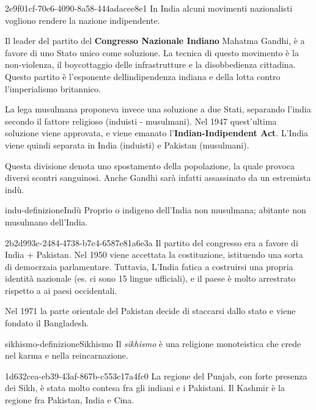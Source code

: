 \documentclass[preview]{standalone}
\begin{document}
\begin{snippet}{2e9f01cf-70e6-4090-8a58-444adacee8e1}
    In India alcuni movimenti nazionalisti vogliono
    rendere la nazione indipendente. 
    
    Il leader del partito del \textbf{Congresso Nazionale Indiano} Mahatma Gandhi,
    è a favore di uno Stato unico come soluzione.
    La tecnica di questo movimento è la non-violenza, il boycottaggio
    delle infrastrutture e la disobbedienza cittadina.
    Questo partito è l'esponente dellindipendenza indiana e della lotta contro l'imperialismo britannico.
    
    La lega musulmana proponeva invece una soluzione a due Stati,
    separando l'india secondo il fattore religioso (induisti - musulmani).
    Nel 1947 quest'ultima soluzione viene approvata, e viene emanato
    l'\textbf{Indian-Indipendent Act}. 
    L'India viene quindi separata in India (induisti) e Pakistan (musulmani).
    
    Questa divisione denota uno spostamento della popolazione,
    la quale provoca diversi scontri sanguinosi.
    Anche Gandhi sarà infatti assassinato da un estremista indù.
\end{snippet}

\begin{snippetdefinition}{indu-definizione}{Indù}
    Proprio o indigeno dell'India non musulmana; abitante non musulmano dell'India.
\end{snippetdefinition}

\begin{snippet}{2b2d993c-2484-4738-b7c4-6587e81a6e3a}
    Il partito del congresso era a favore di India + Pakistan. 
    Nel 1950 viene accettata la costituzione, istituendo una sorta di democrzaia parlamentare.
    Tuttavia, L'India fatica a costruirsi una propria identità nazionale (es. ci sono 15 lingue ufficiali),
    e il paese è molto arrestrato rispetto a ai paesi occidentali.

    Nel 1971 la parte orientale del Pakistan decide di staccarsi dallo stato e viene fondato
    il Bangladesh.
\end{snippet}

\begin{snippetdefinition}{sikhismo-definizione}{Sikhismo}
    Il \textit{sikhismo} è una religione monoteistica che crede nel karma e nella reincarnazione.
\end{snippetdefinition}

\begin{snippet}{1d632cea-eb39-43af-867b-c553c17a4fc0}
    La regione del Punjab, con forte presenza dei Sikh, è stata molto contesa fra gli
    indiani e i Pakistani.
    Il Kashmir è la regione fra Pakistan, India e Cina.
\end{snippet}
\end{document}
